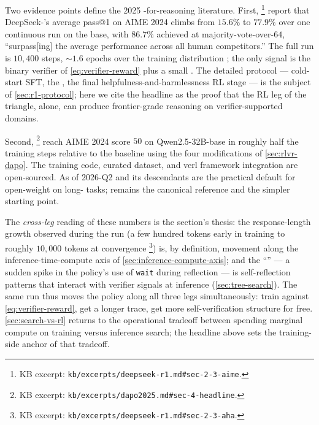 Two evidence points define the 2025 -for-reasoning literature.
First, \citet[\S 2.3]{deepseek-r1}\footnote{KB excerpt:
\nolinkurl{kb/excerpts/deepseek-r1.md#sec-2-3-aime}.} report that
DeepSeek-'s average pass@1 on AIME 2024 climbs from $15.6\%$ to
$77.9\%$ over one continuous  run on the  base, with
$86.7\%$ achieved at majority-vote-over-$64$, ``surpass[ing] the
average performance across all human competitors.'' The full run is
$10{,}400$ steps, $\sim\!1.6$ epochs over the training distribution
\citep[\S 2.1]{deepseek-r1}; the only signal is the binary verifier of
\cref{eq:verifier-reward} plus a small . The detailed
protocol --- cold-start SFT, the , the final
helpfulness-and-harmlessness RL stage --- is the subject of
\cref{sec:r1-protocol}; here we cite the headline as the proof that
the RL leg of the triangle, alone, can produce frontier-grade reasoning
on verifier-supported domains.

Second, \citet[\S 4]{dapo2025}\footnote{KB excerpt:
\nolinkurl{kb/excerpts/dapo2025.md#sec-4-headline}.} reach AIME 2024
score $50$ on Qwen2.5-32B-base in roughly half the training steps
relative to the  baseline using the four modifications of
\cref{sec:rlvr-dapo}. The training code, curated dataset, and verl
framework integration are open-sourced. As of 2026-Q2  and its
descendants are the practical default for open-weight  on long-
tasks;  remains the canonical reference and the simpler starting
point.

The \emph{cross-leg} reading of these numbers is the section's thesis:
the response-length growth observed during the  run (a few
hundred tokens early in training to roughly $10{,}000$ tokens at
convergence \citep[\S 2.3]{deepseek-r1}\footnote{KB excerpt:
\nolinkurl{kb/excerpts/deepseek-r1.md#sec-2-3-aha}.}) is, by definition,
movement along the inference-time-compute axis of
\cref{sec:inference-compute-axis}; and the ``'' --- a sudden
spike in the policy's use of \texttt{wait} during reflection --- is
self-reflection patterns that interact with verifier signals at
inference (\cref{sec:tree-search}). The same  run thus moves the
policy along all three legs simultaneously: train against
\cref{eq:verifier-reward}, get a longer trace, get more
self-verification structure for free. \cref{sec:search-vs-rl} returns
to the operational tradeoff between spending marginal compute on 
training versus inference search; the headline above sets the
training-side anchor of that tradeoff.

